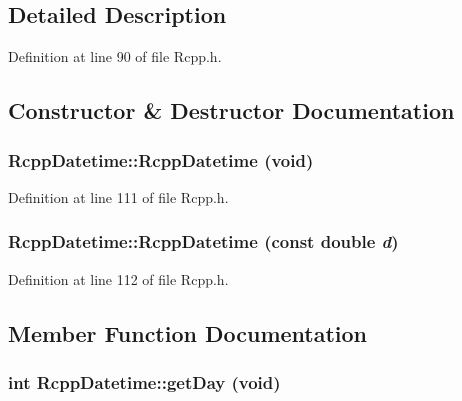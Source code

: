 \subsection{Detailed Description}


Definition at line 90 of file Rcpp.h.

\subsection{Constructor \& Destructor Documentation}
\hypertarget{classRcppDatetime_5a1679444e775781bf038553ef3b04ae}{
\subsubsection[{RcppDatetime}]{\setlength{\rightskip}{0pt plus 5cm}RcppDatetime::RcppDatetime (void)}}
\label{classRcppDatetime_5a1679444e775781bf038553ef3b04ae}




Definition at line 111 of file Rcpp.h.\hypertarget{classRcppDatetime_43972d46cd15e6cb666d61f13bdc31f2}{
\subsubsection[{RcppDatetime}]{\setlength{\rightskip}{0pt plus 5cm}RcppDatetime::RcppDatetime (const double {\em d})}}
\label{classRcppDatetime_43972d46cd15e6cb666d61f13bdc31f2}




Definition at line 112 of file Rcpp.h.

\subsection{Member Function Documentation}
\hypertarget{classRcppDatetime_23e9f09bef162e1ffef0e43f8a446b77}{
\subsubsection[{getDay}]{\setlength{\rightskip}{0pt plus 5cm}int RcppDatetime::getDay (void)}}
\label{classRcppDatetime_23e9f09bef162e1ffef0e43f8a446b77}




